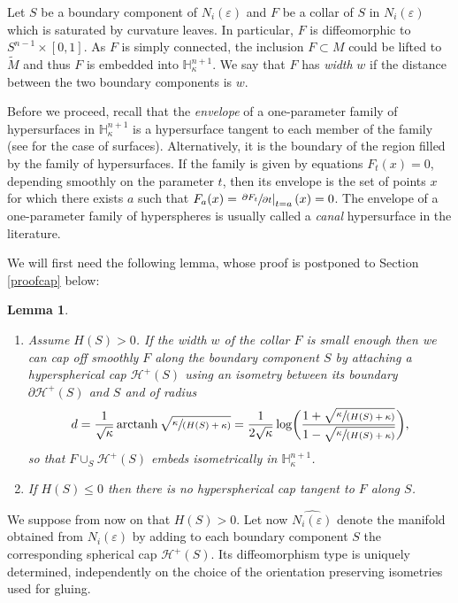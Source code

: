 \documentclass[JEP,XML,SOM,Unicode]{cedram}
\let\mathcal\mathscr
\DeclareMathOperator{\arctanh}{arctanh}
\newcommand{\spfrac}[2]{\sfrac{#1}{(#2)}}
\newtheorem{lemma}[theorem]{Lemma}
\theoremstyle{definition}
\theoremstyle{remark}
\numberwithin{equation}{section}
\begin{document}
Let $S$ be a boundary component of $N_i(\varepsilon)$ and
$F$ be a collar of $S$ in $N_i(\varepsilon)$ which is saturated by
curvature leaves. In particular, $F$ is diffeomorphic to
$S^{n-1}\times [0,1]$. As $F$ is simply connected, the inclusion $F\subset M$ could be lifted
to $\widetilde{M}$ and thus $F$ is embedded into $\mathbb H_{\kappa}^{n+1}$.
We say that $F$ has \emph{width} $w$ if the distance between the
two boundary components is $w$.

Before we proceed, recall that the \emph{envelope} of a one-parameter family of hypersurfaces in
$\mathbb H_{\kappa}^{n+1}$ is a hypersurface tangent to each member of the family (see \cite{Ei} for the case of surfaces).
Alternatively, it is the boundary of the region filled by the family of hypersurfaces. If the family is given by
equations $F_t(x)=0$, depending smoothly on the parameter $t$, then its envelope is the set of points $x$
for which there exists $a$ such that $F_a(x)=\left.\sfrac{\partial F_t}{\partial t}\right|_{t=a}(x)=0$.
The envelope of a one-parameter family of hyperspheres is usually called a \emph{canal} hypersurface in the literature.

We will first need the following lemma, whose proof is postponed to Section \ref{proofcap} below:

\skpt
\begin{lemma}\label{cap}
\begin{enumerate}
\item Assume $H(S) >0$. If the width $w$ of the collar $F$ is
small enough then we can cap off smoothly $F$ along the boundary component
$S$ by attaching a hyperspherical cap $\mathcal H^+(S)$ using an isometry between its boundary
$\partial \mathcal H^+(S)$ and $S$ and
of radius
\[d=\frac{1}{\sqrt{\kappa}}\arctanh \sqrt{\spfrac{\kappa}{H(S)+\kappa}}=
\frac{1}{2\sqrt{\kappa}}\log\biggl(\frac{1+\sqrt{\spfrac{\kappa}{H(S)+\kappa}} }{1-\sqrt{\spfrac{\kappa}{H(S)+\kappa}}}\biggr),\]
so that $F\cup_S \mathcal H^+(S)$ embeds isometrically
in $\mathbb H_{\kappa}^{n+1}$.
\item If $H(S) \leq 0$ then there is no hyperspherical cap tangent to $F$ along $S$.
\end{enumerate}
\end{lemma}

We suppose from now on that $H(S)>0$.
Let now $\widehat{N_i(\varepsilon)}$ denote the manifold obtained
from $N_i(\varepsilon)$ by adding to each boundary component $S$
the corresponding spherical cap $\mathcal H^+(S)$. Its diffeomorphism type is uniquely determined, independently on the
choice of the orientation preserving isometries used for gluing.
\end{document}
